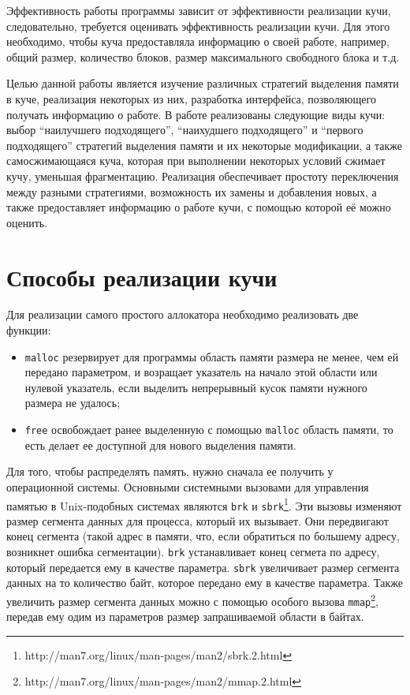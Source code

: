 Эффективность работы программы зависит от эффективности реализации кучи, следовательно, требуется оценивать 
эффективность реализации кучи. Для этого необходимо, чтобы куча предоставляла информацию о своей работе, например, 
общий размер, количество блоков, размер максимального свободного блока и т.д.

Целью данной работы является изучение различных стратегий выделения памяти в куче, реализация некоторых из них, разработка интерфейса, 
позволяющего получать информацию о работе. В работе реализованы следующие виды кучи: выбор ``наилучшего подходящего'', ``наихудшего подходящего'' 
и ``первого подходящего'' стратегий выделения памяти и их некоторые модификации, а также самосжимающаяся куча, которая при выполнении некоторых 
условий сжимает кучу, уменьшая фрагментацию. Реализация обеспечивает простоту переключения между разными стратегиями, возможность  их замены и 
добавления новых, а также предоставляет информацию о работе кучи, с помощью которой её можно оценить.


\section{Способы реализации кучи}

Для реализации самого простого аллокатора необходимо реализовать две функции:

\begin{itemize}
\item \lstinline{malloc} резервирует для программы область памяти размера не менее, чем
ей передано параметром, и возращает указатель на начало этой области или нулевой указатель,
если выделить непрерывный кусок памяти нужного размера не удалось;

\item \lstinline{free} освобождает ранее выделенную с помощью \lstinline{malloc} область памяти, то есть делает 
ее доступной для нового выделения памяти.
\end{itemize}

Для того, чтобы распределять память, нужно сначала ее получить у операционной системы.  
Основными системными вызовами для управления памятью в Unix-подобных системах являются 
\lstinline{brk} и \lstinline{sbrk}\footnote{http://man7.org/linux/man-pages/man2/sbrk.2.html}.
Эти вызовы изменяют размер сегмента данных для процесса, который их вызывает. Они
передвигают конец сегмента (такой адрес в памяти, что, если обратиться по большему
адресу, возникнет ошибка сегментации). \lstinline{brk} устанавливает конец сегмета по адресу,
который передается ему в качестве параметра. \lstinline{sbrk} увеличивает размер
сегмента данных на то количество байт, которое передано ему в качестве параметра. 
Также увеличить размер сегмента данных можно с помощью особого вызова 
\lstinline{mmap}\footnote{http://man7.org/linux/man-pages/man2/mmap.2.html},
передав ему одим из параметров размер запрашиваемой области в байтах.

